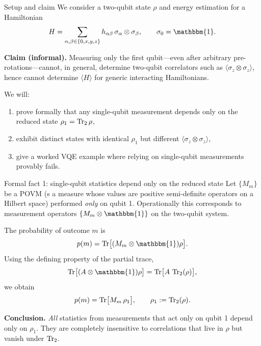 \documentclass[aspectratio=169]{beamer}
\newcommand{\Z}{\sigma_z}
\newcommand{\I}{\mathbbm{1}}
\begin{document}
\begin{frame}{Setup and claim}
We consider a two-qubit state \(\rho\) and energy estimation for a Hamiltonian
\[
H = \sum_{\alpha,\beta\in\{0,x,y,z\}} h_{\alpha\beta}\, \sigma_\alpha\otimes\sigma_\beta,
\qquad \sigma_0=\I.
\]

\medskip
\textbf{Claim (informal).}
Measuring only the first qubit---even after arbitrary pre-rotations---cannot, in general, determine
two-qubit correlators such as \(\langle \Z\otimes\Z\rangle\), hence cannot determine \(\langle H\rangle\)
for generic interacting Hamiltonians.

\medskip
We will:
\begin{enumerate}
\item prove formally that any single-qubit measurement depends only on the reduced state \(\rho_1=\Tr_2\rho\),
\item exhibit distinct states with identical \(\rho_1\) but different \(\langle \Z\otimes\Z\rangle\),
\item give a worked VQE example where relying on single-qubit measurements provably fails.
\end{enumerate}
\end{frame}

\begin{frame}{Formal fact 1: single-qubit statistics depend only on the reduced state}
Let \(\{M_m\}\) be a POVM (s a measure whose values are positive semi-definite operators on a Hilbert space) performed \emph{only} on qubit 1. Operationally this corresponds to
measurement operators \(\{M_m\otimes \I\}\) on the two-qubit system.

\medskip
The probability of outcome \(m\) is
\[
p(m)=\Tr\!\big[(M_m\otimes \I)\rho\big].
\]
Using the defining property of the partial trace,
\[
\Tr\!\big[(A\otimes \I)\rho\big] = \Tr\!\big[A\,\Tr_2(\rho)\big],
\]
we obtain
\[
p(m)=\Tr\!\big[M_m\,\rho_1\big],\qquad \rho_1:=\Tr_2(\rho).
\]

\medskip
\textbf{Conclusion.} \emph{All} statistics from measurements that act only on qubit 1 depend only on \(\rho_1\).
They are completely insensitive to correlations that live in \(\rho\) but vanish under \(\Tr_2\).
\end{frame}
\end{document}

